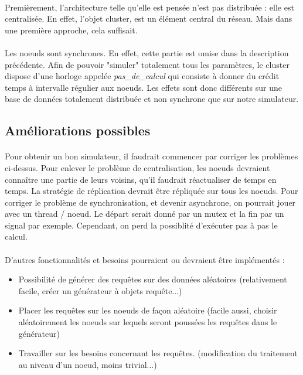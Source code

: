 \documentclass[12pt]{article}
\begin{document}
\paragraph{}Premièrement, l'architecture telle qu'elle est pensée n'est pas distribuée : elle est centralisée. En effet, l'objet cluster, est un élément central du réseau. Mais dans une première approche, cela suffisait.

\paragraph{}Les noeuds sont synchrones. En effet, cette partie est omise dans la description précédente. Afin de pouvoir "simuler" totalement tous les paramètres, le cluster dispose d'une horloge appelée \textit{pas\_de\_calcul} qui consiste à donner du crédit temps à intervalle régulier aux noeuds. Les effets sont donc différents sur une base de données totalement distribuée et non synchrone que sur notre simulateur.

\subsection{Améliorations possibles}

\paragraph{}Pour obtenir un bon simulateur, il faudrait commencer par corriger les problèmes ci-dessus. Pour enlever le problème de centralisation, les noeuds devraient connaître une partie de leurs voisins, qu'il faudrait réactualiser de temps en temps. La stratégie de réplication devrait être répliquée sur tous les noeuds. Pour corriger le problème de synchronisation, et devenir asynchrone, on pourrait jouer avec un thread / noeud. Le départ serait donné par un mutex et la fin par un signal par exemple. Cependant, on perd la possiblité d'exécuter pas à pas le calcul.

\paragraph{}D'autres fonctionnalités et besoins pourraient ou devraient être implémentés : 

\begin{itemize}
    \item Possibilité de générer des requêtes sur des données aléatoires (relativement facile, créer un générateur à objets requête...)
    \item Placer les requêtes sur les noeuds de façon aléatoire (facile aussi, choisir aléatoirement les noeuds sur lequels seront poussées les requêtes dans le générateur)
    \item Travailler sur les besoins concernant les requêtes. (modification du traitement au niveau d'un noeud, moins trivial...)
\end{itemize}
\end{document}
